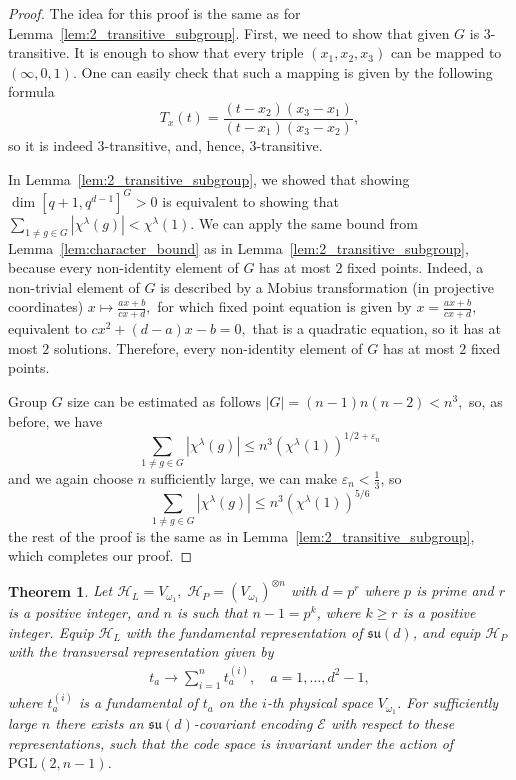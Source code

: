 \documentclass[11pt,letterpaper]{article}
\theoremstyle{plain}
\theoremstyle{plain}
\theoremstyle{plain}
\theoremstyle{plain}
\theoremstyle{plain}
\theoremstyle{plain}
\theoremstyle{plain}
\newtheorem{smtheorem}{Theorem}[section]
\theoremstyle{definition}
\theoremstyle{plain}
\begin{document}
\begin{proof}
    The idea for this proof is the same as for Lemma~\ref{lem:2_transitive_subgroup}. 
    First, we need to show that given $G$ is $3$-transitive. It is enough to show that every triple $(x_1, x_2, x_3)$ can be mapped to $(\infty, 0, 1)$. One can easily check that such a mapping is given by the following formula
    \[
        T_x(t)=\frac{\left(t-x_2\right)\left(x_3-x_1\right)}{\left(t-x_1\right)\left(x_3-x_2\right)},
    \]
    so it is indeed $3$-transitive, and, hence, $3$-transitive.

    In Lemma~\ref{lem:2_transitive_subgroup}, we showed that showing $\dim [q+1, q^{d-1}]^G > 0$ is equivalent to showing that $\sum_{1 \neq g \in G}\left|\chi^\lambda(g)\right|<\chi^\lambda(1)$. 
    We can apply the same bound from Lemma~\ref{lem:character_bound} as in Lemma~\ref{lem:2_transitive_subgroup}, because every non-identity element of $G$ has at most $2$ fixed points. 
    Indeed, a non-trivial element of $G$ is described by a Mobius transformation (in projective coordinates) 
    $
        x \mapsto \frac{a x+b}{c x+d},
    $
    for which fixed point equation is given by
    $
        x = \frac{a x+b}{c x+d},
    $
    equivalent to
    $
        c x^2+(d-a) x-b=0,
    $
    that is a quadratic equation, so it has at most $2$ solutions. Therefore, every non-identity element of $G$ has at most $2$ fixed points.

    Group $G$ size can be estimated as follows
    $
        |G|=(n-1) n(n-2)<n^3,
    $
    so, as before, we have
    \[
        \sum_{1 \neq g \in G}\left|\chi^\lambda(g)\right| \leq n^3\left(\chi^\lambda(1)\right)^{1 / 2+\varepsilon_n}
    \]
    and we again choose $n$ sufficiently large, we can make $\varepsilon_n<\frac{1}{3}$, so
    \[
        \sum_{1 \neq g \in G}\left|\chi^\lambda(g)\right| \leq n^3\left(\chi^\lambda(1)\right)^{5 / 6}
    \]
    the rest of the proof is the same as in Lemma~\ref{lem:2_transitive_subgroup}, which completes our proof.
\end{proof}

\begin{smtheorem}\label{thrm:3_transitive_covariant_code}
        Let
    $
        \mathcal H_L=V_{\omega_1},\;
        \mathcal H_P=(V_{\omega_1})^{\otimes n}
    $
    with $d=p^r$ where $p$ is prime and $r$ is a positive integer, 
    and $n$ is such that $n-1=p^k$, where $k \geq r$ is a positive integer. 
    Equip \(\mathcal H_L\) with the fundamental representation of
    \(\mathfrak{su}(d)\), and equip \(\mathcal H_P\) with the transversal
    representation given by
    \begin{equation}
    \begin{gathered}
    t_a \rightarrow \sum_{i=1}^n t_a^{(i)}, \quad a=1,\ldots,d^2-1,
    \end{gathered}
    \end{equation} 
    where $t_a^{(i)}$ is a fundamental of $t_a$ on the $i$-th physical space $V_{\omega_1}$.
    For sufficiently
    large $n$ there exists an $\mathfrak{su}(d)$-covariant encoding $\mathcal{E}$ with respect to these representations, 
    such that the code space is invariant under the action of $\mathrm{PGL}(2, n-1)$. 
\end{smtheorem}
\end{document}
